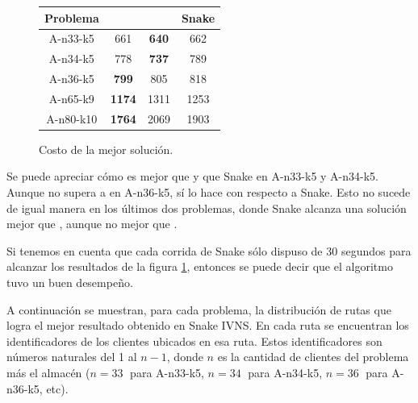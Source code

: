 \documentclass[a4paper,10pt,twocolumn]{article}
\begin{document}
	\begin{figure}[h!]%
		\begin{center}
			\begin{tabular}{|c|c|c|c|} \hline
			Problema 	& \cite{benchmark} & \cite{Camila} & Snake \\ \hline
			A-n33-k5 			&  	661		&  \textbf{640}		& 662 \\ \hline
			A-n34-k5 & 778 & \textbf{737} & 789 \\ \hline
			A-n36-k5 & \textbf{799} & 805 & 818 \\ \hline
			A-n65-k9			& 	\textbf{1174}		& 1311		& 1253	\\ \hline
			A-n80-k10 			& 	\textbf{1764}		&  	2069	& 1903	\\ \hline
			\end{tabular}
			\caption{Costo de la mejor soluci\'on. \label{fig:results}}
		\end{center}
	\end{figure}
	

	Se puede apreciar c\'omo \cite{Camila} es mejor que \cite{benchmark} y que Snake en A-n33-k5 y A-n34-k5. Aunque \cite{Camila} no supera a \cite{benchmark} en A-n36-k5, s\'i lo hace con respecto a Snake. Esto no sucede de igual manera en los \'ultimos dos problemas, donde Snake alcanza una soluci\'on mejor que \cite{Camila}, aunque no mejor que \cite{benchmark}.

	Si tenemos en cuenta que cada corrida de Snake s\'olo dispuso de 30 segundos para alcanzar los resultados de la figura \ref{fig:results}, entonces se puede decir que el algoritmo tuvo un buen desempeño.

	A continuación se muestran, para cada problema, la distribución de 
	rutas que logra el mejor resultado obtenido en Snake IVNS. 
	En cada ruta se encuentran los identificadores de los clientes ubicados	en esa ruta. 
	Estos identificadores son números naturales del 1 al $n-1$, donde $n$ es la cantidad 
	de clientes del problema m\'as el almac\'en ($n = 33\;$ para A-n33-k5,
	$n = 34\;$ para A-n34-k5, $n = 36\;$ para A-n36-k5, etc).
	
\end{document}
